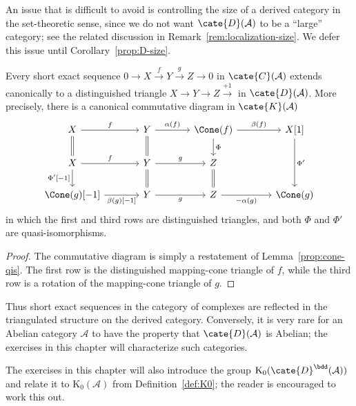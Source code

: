 An issue that is difficult to avoid is controlling the size of a derived
category in the set-theoretic sense, since we do not want
$\cate{D}(\mathcal{A})$ to be a “large” category; see the related discussion
in Remark~\ref{rem:localization-size}. We defer this issue until
Corollary~\ref{prop:D-size}.

\begin{proposition}\label{prop:ses-vs-triangle}
	Every short exact sequence
	$0 \to X \xrightarrow{f} Y \xrightarrow{g} Z \to 0$ in
	$\cate{C}(\mathcal{A})$ extends canonically to a distinguished triangle
	$X \to Y \to Z \xrightarrow{+1}$ in $\cate{D}(\mathcal{A})$. More
	precisely, there is a canonical commutative diagram in
	$\cate{K}(\mathcal{A})$
	\[\begin{tikzcd}[column sep=large]
		X \arrow[r, "f"] \arrow[equal, d] & Y \arrow[equal, d] \arrow[r, "\alpha(f)"] & \Cone(f) \arrow[r, "\beta(f)"] \arrow[d, "\Phi"] & {X[1]} \arrow[dd, "{\Phi'}"] \\
		X \arrow[r, "f"] \arrow[d, "{\Phi'[-1]}"'] & Y \arrow[r, "g"] \arrow[equal, d] & Z \arrow[equal, d] & \\
		{\Cone(g)[-1]} \arrow[r, "{\beta(g)[-1]}"'] & Y \arrow[r, "g"'] & Z \arrow[r, "{-\alpha(g)}"'] & \Cone(g)
	\end{tikzcd}\]
	in which the first and third rows are distinguished triangles, and both
	$\Phi$ and $\Phi'$ are quasi-isomorphisms.
\end{proposition}

\begin{proof}
	The commutative diagram is simply a restatement of
	Lemma~\ref{prop:cone-qis}. The first row is the distinguished
	mapping-cone triangle of $f$, while the third row is a rotation of the
	mapping-cone triangle of $g$.
\end{proof}

Thus short exact sequences in the category of complexes are reflected in the
triangulated structure on the derived category. Conversely, it is very rare
for an Abelian category $\mathcal{A}$ to have the property that
$\cate{D}(\mathcal{A})$ is Abelian; the exercises in this chapter will
characterize such categories.

The exercises in this chapter will also introduce the group
$\mathrm{K}_0(\cate{D}^{\bdd}(\mathcal{A}))$ and relate it to
$\mathrm{K}_0(\mathcal{A})$ from Definition~\ref{def:K0}; the reader is
encouraged to work this out.

